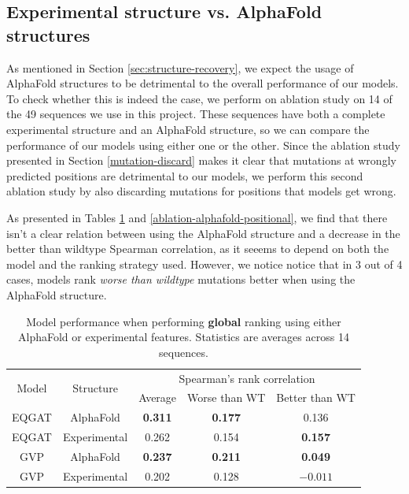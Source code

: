 \documentclass[12pt,a4paper]{report}
\begin{document}
\subsection{Experimental structure vs. AlphaFold structures}
\label{appendix-exp-vs-alphafold}
As mentioned in Section \ref{sec:structure-recovery}, we expect the usage of AlphaFold structures to be detrimental to the overall performance of our models. To check whether this is indeed the case, we perform on ablation study on 14 of the 49 sequences we use in this project. These sequences have both a complete experimental structure and an AlphaFold structure, so we can compare the performance of our models using either one or the other. Since the ablation study presented in Section \ref{mutation-discard} makes it clear that mutations at wrongly predicted positions are detrimental to our models, we perform this second ablation study by also discarding mutations for positions that models get wrong.

As presented in Tables \ref{ablation-alphafold-global} and \ref{ablation-alphafold-positional}, we find that there isn't a clear relation between using the AlphaFold structure and a decrease in the better than wildtype Spearman correlation, as it seeems to depend on both the model and the ranking strategy used. However, we notice notice that in 3 out of 4 cases, models rank \textit{worse than wildtype} mutations better when using the AlphaFold structure. 

\begin{table}[!h]
\caption{Model performance when performing \textbf{global} ranking using either AlphaFold or experimental features. Statistics are averages across 14 sequences.}
\label{ablation-alphafold-global}
\vskip 0.15in
\begin{center}
\begin{small}
\begin{sc}
\begin{tabular}{@{}ccccc@{}}
\toprule
\multirow{2}{*}{Model} & \multirow{2}{*}{Structure} & \multicolumn{3}{c}{Spearman's rank correlation}  \\ \cmidrule(l){3-5} 
                       &                            & Average        & Worse than WT  & Better than WT \\ \midrule
EQGAT                  & AlphaFold                  & \textbf{0.311} & \textbf{0.177} & 0.136          \\
EQGAT                  & Experimental               & 0.262          & 0.154          & \textbf{0.157} \\ \midrule
GVP                    & AlphaFold                  & \textbf{0.237} & \textbf{0.211} & \textbf{0.049} \\
GVP                    & Experimental               & 0.202          & 0.128          & $-0.011$         \\ \bottomrule
\end{tabular}
\end{sc}
\end{small}
\end{center}
\vskip -0.1in
\end{table}
\end{document}
